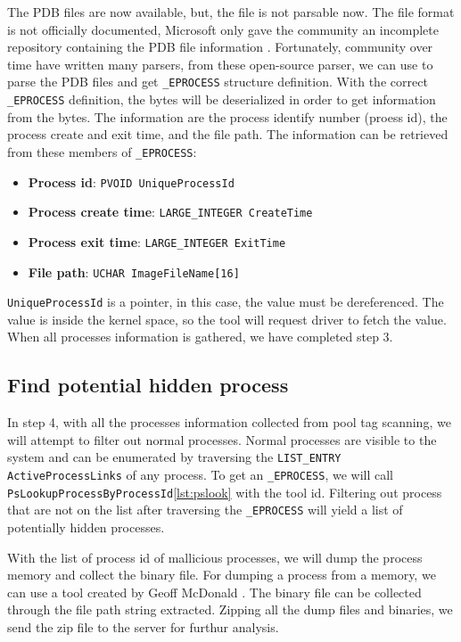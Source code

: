 The PDB files are now available, but, the file is not parsable now. The file format is not officially documented, Microsoft only gave the community an incomplete repository containing the PDB file information \cite{microsoft-pdb}. Fortunately, community over time have written many parsers, from these open-source parser, we can use to parse the PDB files and get \texttt{\_EPROCESS} structure definition. With the correct \texttt{\_EPROCESS} definition, the bytes will be deserialized in order to get information from the bytes. The information are the process identify number (proess id), the process create and exit time, and the file path. The information can be retrieved from these members of \texttt{\_EPROCESS}:

\begin{itemize}
  \item \textbf{Process id}: \texttt{PVOID UniqueProcessId}
  \item \textbf{Process create time}: \texttt{LARGE\_INTEGER CreateTime}
  \item \textbf{Process exit time}: \texttt{LARGE\_INTEGER ExitTime}
  \item \textbf{File path}: \texttt{UCHAR ImageFileName[16]}
\end{itemize}

\texttt{UniqueProcessId} is a pointer, in this case, the value must be dereferenced. The value is inside the kernel space, so the tool will request driver to fetch the value. When all processes information is gathered, we have completed step 3.

\subsection[Find potential hidden process]{Find potential hidden process}

In step 4, with all the processes information collected from pool tag scanning, we will attempt to filter out normal processes. Normal processes are visible to the system and can be enumerated by traversing the \texttt{LIST\_ENTRY ActiveProcessLinks} of any process. To get an \texttt{\_EPROCESS}, we will call \texttt{PsLookupProcessByProcessId}\ref{lst:pslook} with the tool id. Filtering out process that are not on the list after traversing the \texttt{\_EPROCESS} will yield a list of potentially hidden processes.

With the list of process id of mallicious processes, we will dump the process memory and collect the binary file. For dumping a process from a memory, we can use a tool created by Geoff McDonald \cite{processdump}. The binary file can be collected through the file path string extracted. Zipping all the dump files and binaries, we send the zip file to the server for furthur analysis.


